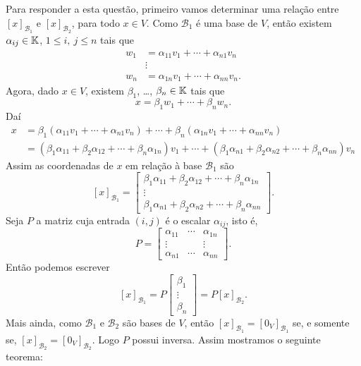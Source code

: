 Para responder a esta questão, primeiro vamos determinar uma relação entre $[x]_{\mathcal{B}_1}$ e $[x]_{\mathcal{B}_2}$, para todo $x \in V$. Como $\mathcal{B}_1$ é uma base de $V$, então existem $\alpha_{ij} \in \mathbb{K}$, $1 \le i,\ j \le n$ tais que
\begin{align*}
  w_1 &= \alpha_{11}v_1 + \cdots + \alpha_{n1}v_n\\
  &\vdots\\
  w_n &= \alpha_{1n}v_1 + \cdots + \alpha_{nn}v_n.
\end{align*}
Agora, dado $x \in V$, existem $\beta_1$, \dots, $\beta_n \in \mathbb{K}$ tais que
\[
  x = \beta_1w_1 + \cdots + \beta_nw_n.
\]
Daí
\begin{align*}
  x &= \beta_1(\alpha_{11}v_1 + \cdots + \alpha_{n1}v_n) + \cdots + \beta_n(\alpha_{1n}v_1 + \cdots + \alpha_{nn}v_n)\\
  &= (\beta_1\alpha_{11} + \beta_2\alpha_{12} + \cdots + \beta_n\alpha_{1n})v_1 + \cdots + (\beta_1\alpha_{n1} + \beta_2\alpha_{n2} + \cdots + \beta_n\alpha_{nn})v_n
\end{align*}
Assim as coordenadas de $x$ em relação \`a base $\mathcal{B}_1$ são
\[
  [x]_{\mathcal{B}_1} = \begin{bmatrix}
    \beta_1\alpha_{11} + \beta_2\alpha_{12} + \cdots + \beta_n\alpha_{1n}\\
    \vdots\\
    \beta_1\alpha_{n1} + \beta_2\alpha_{n2} + \cdots + \beta_n\alpha_{nn}
  \end{bmatrix}.
\]
Seja $P$ a matriz cuja entrada $(i,j)$ é o escalar $\alpha_{ij}$, isto é,
\[
  P = \begin{bmatrix}
    \alpha_{11} & \cdots & \alpha_{1n}\\
    \vdots & & \vdots\\
    \alpha_{n1} & \cdots & \alpha_{nn}
  \end{bmatrix}.
\]
Então podemos escrever
\[
  [x]_{\mathcal{B}_1} = P \begin{bmatrix}
    \beta_1\\
    \vdots\\
    \beta_n
  \end{bmatrix} = P[x]_{\mathcal{B}_2}.
\]
Mais ainda, como $\mathcal{B}_1$ e $\mathcal{B}_2$ são bases de $V$, então $[x]_{\mathcal{B}_1} = [0_V]_{\mathcal{B}_1}$ se, e somente se, $[x]_{\mathcal{B}_2} = [0_V]_{\mathcal{B}_2}$. Logo $P$ possui inversa. Assim mostramos o seguinte teorema:

